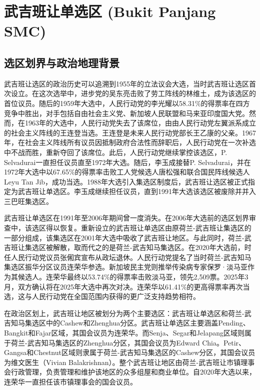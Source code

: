 \documentclass[11pt,a4paper,twoside,openany]{book}
\begin{document}
\chapter{武吉班让单选区 (Bukit Panjang SMC)}

\section{选区划界与政治地理背景}
武吉班让选区的政治历史可以追溯到1955年的立法议会大选，当时武吉班让选区首次设立。在这次选举中，进步党的吴东亮击败了劳工阵线的林维土，成为该选区的首位议员。随后的1959年大选中，人民行动党的李光耀以58.31\%的得票率在四方竞争中胜出，对手包括自由社会主义党、新加坡人民联盟和马来亚印度国大党。然而，在1963年的大选中，人民行动党失去了该席位，由由人民行动党左翼派系成立的社会主义阵线的王连登当选。王连登是未来人民行动党部长王乙康的父亲。1967年，在社会主义阵线所有议员因抵制政府合法性而辞职后，人民行动党在一次补选中不战而胜，重新夺回了该席位。此后，人民行动党继续掌控该选区，P. Selvadurai一直担任议员直至1972年大选。随后，李玉成接替P. Selvadurai，并在1972年大选中以67.65\%的得票率击败工人党候选人唐松强和联合国民阵线候选人Leyu Tan Jib，成功当选。1988年大选引入集选区制度后，武吉班让选区被正式指定为武吉班让单选区。李玉成继续担任议员，直到1991年大选该选区被废除并并入三巴旺集选区。

武吉班让单选区在1991年至2006年期间曾一度消失。在2006年大选前的选区划界审查中，该选区得以恢复。重新设立的武吉班让单选区由原荷兰-武吉班让集选区的一部分组成，该集选区在2001年大选中吸收了武吉班让地区。与此同时，荷兰-武吉班让集选区被解散，取而代之的是荷兰-武吉知马集选区。在2020年大选前，时任人民行动党议员张俰宾宣布从政坛退休。人民行动党提名了当时荷兰-武吉知马集选区振华分区议员连荣华参选。新加坡民主党则推举传染病专家保罗·淡马亚作为其候选人。连荣华最终以53.74\%的得票率击败淡马亚，领先2,509票。2025年3月，双方确认将在2025年大选中再次对决。连荣华以61.41\%的更高得票率再次当选，这与人民行动党在全国范围内获得的更广泛支持趋势相符。

在政治区划上，武吉班让地区被划分为两个主要选区：武吉班让单选区和荷兰-武吉知马集选区中的Cashew和Zhenghua分区。武吉班让单选区主要涵盖Pending、Bangkit和Fajar区域，其国会议员为连荣华。而Senja、Segar和Jelapang区域则属于荷兰-武吉知马集选区的Zhenghua分区，其国会议员为Edward Chia。Petir、Gangsa和Chestnut区域则隶属于荷兰-武吉知马集选区的Cashew分区，其国会议员为维文医生（Vivian Balakrishnan）。整个武吉班让地区由荷兰-武吉班让市镇理事会行政管理，负责管理和维护该地区的众多组屋和商业单位。自2020年大选以来，连荣华一直担任该市镇理事会的国会议员。
\end{document}
